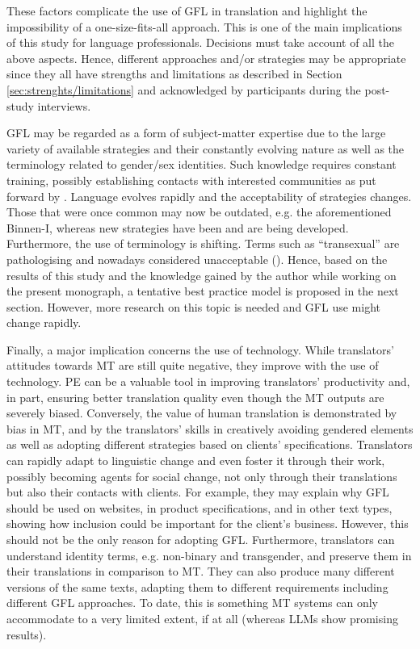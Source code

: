 These factors complicate the use of GFL in translation and highlight the impossibility of a one-size-fits-all approach. This is one of the main implications of this study for language professionals. Decisions must take account of all the above aspects. Hence, different approaches and/or strategies may be appropriate since they all have strengths and limitations as described in Section \ref{sec:strenghts/limitations} and acknowledged by participants during the post-study interviews.

GFL may be regarded as a form of subject-matter expertise due to the large variety of available strategies and their constantly evolving nature as well as the terminology related to gender/sex identities. Such knowledge requires constant training, possibly establishing contacts with interested communities as put forward by \textcite{attig2023call}. Language evolves rapidly and the acceptability of strategies changes. Those that were once common may now be outdated, e.g. the aforementioned Binnen-I, whereas new strategies have been and are being developed. Furthermore, the use of terminology is shifting. Terms such as ``transexual'' are pathologising and nowadays considered unacceptable (\cite{lopez2019tu}). Hence, based on the results of this study and the knowledge gained by the author while working on the present monograph, a tentative best practice model is proposed in the next section. However, more research on this topic is needed and GFL use might change rapidly.

Finally, a major implication concerns the use of technology. While translators' attitudes towards MT are still quite negative, they improve with the use of technology. PE can be a valuable tool in improving translators' productivity and, in part, ensuring better translation quality even though the MT outputs are severely biased. Conversely, the value of human translation is demonstrated by bias in MT, and by the translators' skills in creatively avoiding gendered elements as well as adopting different strategies based on clients' specifications. Translators can rapidly adapt to linguistic change and even foster it through their work, possibly becoming agents for social change, not only through their translations but also their contacts with clients. For example, they may explain why GFL should be used on websites, in product specifications, and in other text types, showing how inclusion could be important for the client's business. However, this should not be the only reason for adopting GFL. Furthermore, translators can understand identity terms, e.g. non-binary and transgender, and preserve them in their translations in comparison to MT. They can also produce many different versions of the same texts, adapting them to different requirements including different GFL approaches. To date, this is something MT systems can only accommodate to a very limited extent, if at all (whereas LLMs show promising results).

